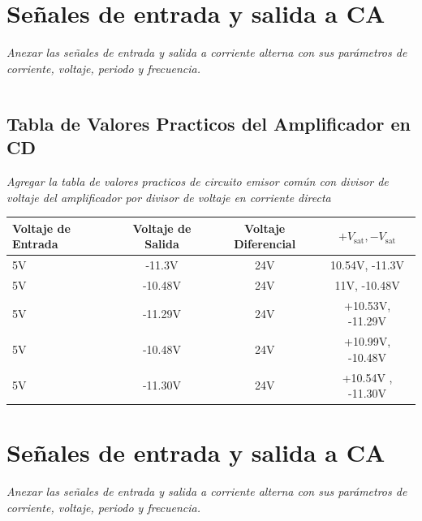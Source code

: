 \documentclass[11pt]{scrartcl}
\newcommand{\indicacion}[1]{\noindent\textit{\small #1}}
\begin{document}
\section{Señales de entrada y salida a CA}
\indicacion{
    Anexar las señales de entrada y salida a corriente alterna con sus parámetros de corriente, voltaje, periodo y frecuencia.
}

\begin{center}
\begin{tabular}{|p{6cm}|p{6cm}|}
\hline
&  \\[100px]
\hline
\end{tabular}
\end{center}



\subsection{Tabla de Valores Practicos del Amplificador en CD}
\indicacion{
Agregar la tabla de valores practicos de circuito emisor común con divisor de voltaje del amplificador por divisor de voltaje en corriente directa
}

\begin{center}
\begin{tabular}{|p{3cm}|c|c|c|}
\hline
\textbf{Voltaje de Entrada}& \textbf{Voltaje de Salida} & \textbf{Voltaje Diferencial} & \textbf{$+V_{\text{sat}}, -V_{\text{sat}}$}\\
\hline
5V & -11.3V & 24V&  10.54V, -11.3V\\[4px]
\hline
5V & -10.48V & 24V& 11V, -10.48V\\[4px]
\hline
5V & -11.29V & 24V& +10.53V, -11.29V\\[4px]
\hline
5V & -10.48V& 24V& +10.99V, -10.48V\\[4px]
\hline
5V & -11.30V& 24V& +10.54V , -11.30V\\[4px]
\hline
\end{tabular}
\end{center}


\section{Señales de entrada y salida a CA}
\indicacion{
    Anexar las señales de entrada y salida a corriente alterna con sus parámetros de corriente, voltaje, periodo y frecuencia.
}

\begin{center}
\begin{tabular}{|p{6cm}|p{6cm}|}
\hline
&  \\[100px]
\hline
\end{tabular}
\end{center}
\end{document}
